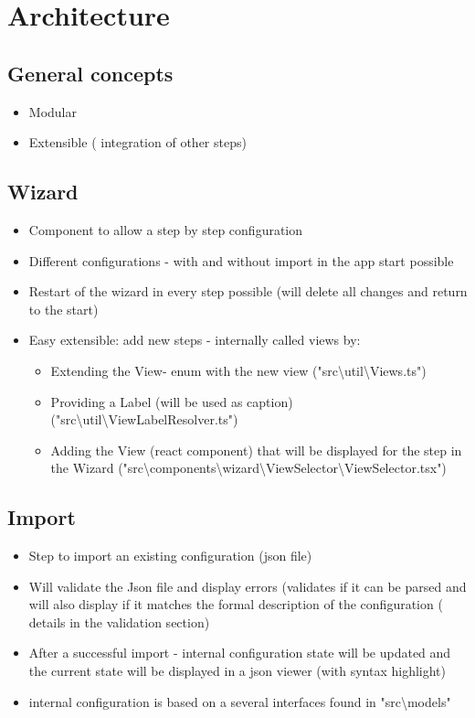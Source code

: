 \section{Architecture}
\label{sec:architecture}

\subsection{General concepts}
\begin{itemize}
    \item Modular
    \item Extensible ( integration of other steps)
\end{itemize}

\subsection{Wizard}
\begin{itemize}
    \item Component to allow a step by step configuration
    \item Different configurations - with and without import in the app start possible
    \item Restart of the wizard in every step possible (will delete all changes and return to the start)
    \item Easy extensible: add new steps - internally called views by:
    \begin{itemize}
        \item Extending the View- enum with the new view ("src\textbackslash util\textbackslash Views.ts")
        \item Providing a Label (will be used as caption) ("src\textbackslash util\textbackslash ViewLabelResolver.ts")
        \item Adding the View (react component) that will be displayed for the step in the Wizard ("src\textbackslash components\textbackslash wizard\textbackslash ViewSelector\textbackslash ViewSelector.tsx")
    \end{itemize}
\end{itemize}

\subsection{Import}
\begin{itemize}
    \item Step to import an existing configuration (json file)
    \item Will validate the Json file and display errors (validates if it can be parsed and will also display if it matches the formal description of the configuration ( details in the validation section) 
    \item After a successful import - internal configuration state will be updated and the current state will be displayed in a json viewer (with syntax highlight)
    \item internal configuration is based on a several interfaces found in "src\textbackslash models"
\end{itemize}


